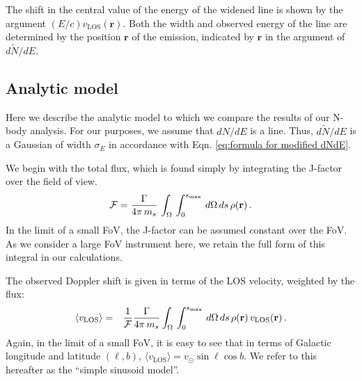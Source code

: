 \documentclass[aps,prd,10pt,twocolumn,superscriptaddress,showpacs,footinbib]{revtex4-1}
\newcommand{\br}[0]{\mathbf{r}}
\newcommand{\los}[0]{\mathrm{LOS}}
\begin{document}
The shift in the central value of the energy of the widened line is shown by the argument $(E/c)
v_\los(\br) $.  Both the width and observed energy of the line are determined by the position
$\br$ of the emission, indicated by $\br$ in the argument of $d\tilde{N}/dE$.

\subsection{Analytic model}
\label{sec:anmod}



Here we describe the analytic model to which we compare the results of our N-body analysis.
For our purposes, we assume that $dN/dE$ is a line. Thus, $d\tilde{N}/dE$ is a Gaussian of width $\sigma_E$
in accordance with Eqn. \eqref{eq:formula for modified dNdE}.

We begin with the total flux, which is found simply by integrating the J-factor over the field of
view. 
\begin{eqnarray}
\mathcal{F} =  \frac{\Gamma}{4\pi \, m_s} \, \int _\Omega \, \int _0 ^{s_{\rm max}}  \,  d\Omega\,ds
\, \rho(\br) \, .
\label{eq:lineflux}
\end{eqnarray}
In the limit of a small FoV, the J-factor can be assumed constant over the FoV. As we
consider a large FoV instrument here, we retain the full form of this integral in our calculations.

The observed Doppler shift is given in terms of the LOS velocity, weighted by the flux:
\begin{eqnarray}
	\langle v_\los\rangle &=& \frac{1}{\mathcal{F}}\frac{\Gamma}{4\pi \, m_s} 
	\int _\Omega \, \int _0 ^{s_{\rm max}}  \, d\Omega\,ds \, \rho(\br) \, v_\los(\br) \, .
\label{eq:lineshift}
\end{eqnarray}
Again, in the limit of a small FoV, it is easy to see that in terms of Galactic longitude and
latitude $(\ell, b)$, $\langle v_\los\rangle = v_\odot \sin \ell\cos b$. We refer to this hereafter
as the ``simple sinusoid model''. 
\end{document}

